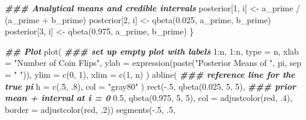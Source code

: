 \documentclass[
  11pt,
]{article}
\newenvironment{Shaded}{\begin{snugshade}}{\end{snugshade}}
\newcommand{\AttributeTok}[1]{\textcolor[rgb]{0.77,0.63,0.00}{#1}}
\newcommand{\DecValTok}[1]{\textcolor[rgb]{0.00,0.00,0.81}{#1}}
\newcommand{\DocumentationTok}[1]{\textcolor[rgb]{0.56,0.35,0.01}{\textbf{\textit{#1}}}}
\newcommand{\FloatTok}[1]{\textcolor[rgb]{0.00,0.00,0.81}{#1}}
\newcommand{\FunctionTok}[1]{\textcolor[rgb]{0.00,0.00,0.00}{#1}}
\newcommand{\NormalTok}[1]{#1}
\newcommand{\OtherTok}[1]{\textcolor[rgb]{0.56,0.35,0.01}{#1}}
\newcommand{\SpecialCharTok}[1]{\textcolor[rgb]{0.00,0.00,0.00}{#1}}
\newcommand{\StringTok}[1]{\textcolor[rgb]{0.31,0.60,0.02}{#1}}
\begin{document}
\begin{Shaded}
\begin{Highlighting}[]
  \DocumentationTok{\#\#\# Analytical means and credible intervals}
\NormalTok{  posterior[}\DecValTok{1}\NormalTok{, i] }\OtherTok{\textless{}{-}}\NormalTok{ a\_prime }\SpecialCharTok{/}\NormalTok{ (a\_prime }\SpecialCharTok{+}\NormalTok{ b\_prime)}
\NormalTok{  posterior[}\DecValTok{2}\NormalTok{, i] }\OtherTok{\textless{}{-}} \FunctionTok{qbeta}\NormalTok{(}\FloatTok{0.025}\NormalTok{, a\_prime, b\_prime)}
\NormalTok{  posterior[}\DecValTok{3}\NormalTok{, i] }\OtherTok{\textless{}{-}} \FunctionTok{qbeta}\NormalTok{(}\FloatTok{0.975}\NormalTok{, a\_prime, b\_prime)}
\NormalTok{\}}

\DocumentationTok{\#\# Plot}
\FunctionTok{plot}\NormalTok{(                                }\DocumentationTok{\#\#\# set up empty plot with labels}
  \DecValTok{1}\SpecialCharTok{:}\NormalTok{n, }\DecValTok{1}\SpecialCharTok{:}\NormalTok{n,}
  \AttributeTok{type =} \StringTok{\textquotesingle{}n\textquotesingle{}}\NormalTok{,}
  \AttributeTok{xlab =} \StringTok{"Number of Coin Flips"}\NormalTok{,}
  \AttributeTok{ylab =} \FunctionTok{expression}\NormalTok{(}\FunctionTok{paste}\NormalTok{(}\StringTok{"Posterior Means of "}\NormalTok{,}
\NormalTok{                          pi,}
                          \AttributeTok{sep =} \StringTok{" "}\NormalTok{)), }
  \AttributeTok{ylim =} \FunctionTok{c}\NormalTok{(}\DecValTok{0}\NormalTok{, }\DecValTok{1}\NormalTok{),}
  \AttributeTok{xlim =} \FunctionTok{c}\NormalTok{(}\DecValTok{1}\NormalTok{, n)}
\NormalTok{)}
\FunctionTok{abline}\NormalTok{(                              }\DocumentationTok{\#\#\# reference line for the true pi}
  \AttributeTok{h =} \FunctionTok{c}\NormalTok{(.}\DecValTok{5}\NormalTok{, .}\DecValTok{8}\NormalTok{),}
  \AttributeTok{col =} \StringTok{"gray80"}
\NormalTok{)}
\FunctionTok{rect}\NormalTok{(}\SpecialCharTok{{-}}\NormalTok{.}\DecValTok{5}\NormalTok{, }\FunctionTok{qbeta}\NormalTok{(}\FloatTok{0.025}\NormalTok{, }\DecValTok{5}\NormalTok{, }\DecValTok{5}\NormalTok{),        }\DocumentationTok{\#\#\# prior mean + interval at i = 0}
     \FloatTok{0.5}\NormalTok{, }\FunctionTok{qbeta}\NormalTok{(}\FloatTok{0.975}\NormalTok{, }\DecValTok{5}\NormalTok{, }\DecValTok{5}\NormalTok{),}
     \AttributeTok{col =} \FunctionTok{adjustcolor}\NormalTok{(}\StringTok{\textquotesingle{}red\textquotesingle{}}\NormalTok{, .}\DecValTok{4}\NormalTok{),}
     \AttributeTok{border =} \FunctionTok{adjustcolor}\NormalTok{(}\StringTok{\textquotesingle{}red\textquotesingle{}}\NormalTok{, .}\DecValTok{2}\NormalTok{))}
\FunctionTok{segments}\NormalTok{(}\SpecialCharTok{{-}}\NormalTok{.}\DecValTok{5}\NormalTok{, .}\DecValTok{5}\NormalTok{,}

\end{Highlighting}
\end{Shaded}
\end{document}
